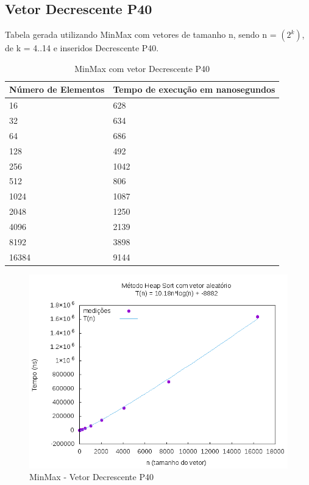 \documentclass[12pt,a4paper,twoside]{report}
\begin{document}
\subsection{Vetor Decrescente P40}
Tabela gerada utilizando MinMax com vetores de tamanho n, sendo n = $(2^k)$, de k = 4..14 e inseridos Decrescente P40.
\begin{table}[H]
\centering
\caption{MinMax com vetor Decrescente P40}
\label{my-label}
\begin{tabular}{|l|l|}
\hline
\multicolumn{1}{|c|}{\textbf{Número de Elementos}} & \multicolumn{1}{c|}{\textbf{Tempo de execução em nanosegundos}} \\ \hline
16 & 628 \\ \hline
32 & 634 \\ \hline
64 & 686 \\ \hline
128 & 492 \\ \hline
256 & 1042 \\ \hline
512 & 806 \\ \hline
1024 & 1087 \\ \hline
2048 & 1250 \\ \hline
4096 & 2139 \\ \hline
8192 & 3898 \\ \hline
16384 & 9144 \\ \hline
\end{tabular}
\end{table}

\begin{figure}[H]
    \centering
    \includegraphics[width=0.7\linewidth]{graficos/HeapSort/vIntAleatorio/vIntAleatorio.png}
  \caption{MinMax - Vetor Decrescente P40}
\end{figure}
\end{document}
